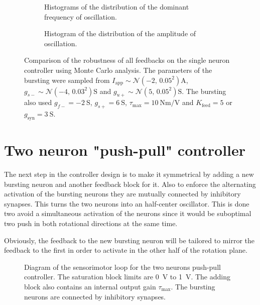 \begin{figure}[!htbp]
    \centering
    \begin{subfigure}[t]{\textwidth}
        \centering
        \caption{Histograms of the distribution of the dominant frequency of oscillation.}
        \label{fig:single_monte_freq_robust}
    \end{subfigure}
    
    \begin{subfigure}[b]{\textwidth}
        \centering
        \caption{Histogram of the distribution of the amplitude of oscillation.}
        \label{fig:single_monte_range_robust}
    \end{subfigure}
    \caption{Comparison of the robustness of all feedbacks on the single neuron controller using Monte Carlo analysis. 
    The parameters of the bursting were sampled from $I_\text{app} \sim \mathcal{N}\left(-2,\, 0.05^2\right) \unit{\ampere}$, $g_{s-} \sim \mathcal{N}\left(-4,\, 0.03^2\right) \unit{\siemens}$ and $g_{u+} \sim \mathcal{N}\left(5,\, 0.05^2\right) \unit{\siemens}$. 
    The bursting also used $g_{f-} = \qty{-2}{\siemens}$, $g_{s+} = \qty{6}{\siemens}$, $\tau_\text{max} = \qty{10}{\newton\meter\per\volt}$ and $K_\text{feed} = 5$ or $g_{\text{syn}} = \qty{3}{\siemens}$.}
    \label{fig:single_monte_robust}
\end{figure}

\FloatBarrier
\section{Two neuron "push-pull" controller}\label{sec:two_neuron}

The next step in the controller design is to make it symmetrical by adding a new bursting neuron and another feedback block for it. 
Also to enforce the alternating activation of the bursting neurons they are mutually connected by inhibitory synapses. 
This turns the two neurons into an half-center oscillator. 
This is done two avoid a simultaneous activation of the neurons since it would be suboptimal two push in both rotational directions at the same time. 

Obviously, the feedback to the new bursting neuron will be tailored to mirror the feedback to the first in order to activate in the other half of the rotation plane. 

\begin{figure}[!htb]
    \centering
    \caption{Diagram of the sensorimotor loop for the two neurons push-pull controller. The saturation block limits are \qty{0}{\volt} to \qty{1}{\volt}. The adding block also contains an internal output gain $\tau_\text{max}$. The bursting neurons are connected by inhibitory synapses.}
    \label{fig:two_motor}
\end{figure}

